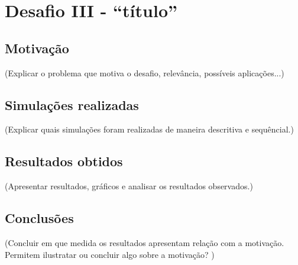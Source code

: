 \section{Desafio III - ``título''} 

\subsection{Motivação}
(Explicar o problema que motiva o desafio, relevância, possíveis aplicações...) 

\subsection{Simulações realizadas}
(Explicar quais simulações foram realizadas de maneira descritiva e sequêncial.) 

\subsection{Resultados obtidos}
(Apresentar resultados, gráficos e analisar os resultados observados.) 

\subsection{Conclusões}
(Concluir em que medida os resultados apresentam relação com a motivação. Permitem ilustratar ou concluir algo sobre a motivação? )